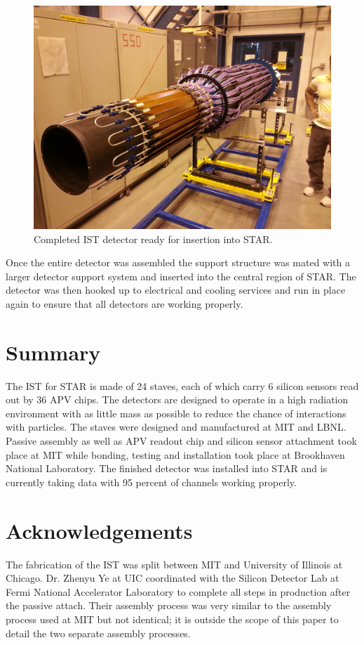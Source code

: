\documentclass[preprint,12pt]{elsarticle}
\begin{document}
\begin{figure}
\begin{center}
\includegraphics[width=5in, keepaspectratio=true, angle=0]{graphics/full.jpg}
\caption{Completed IST detector ready for insertion into STAR.
\label{fig:full}}
\end{center}
\end{figure}
%
Once the entire detector was assembled the support structure was mated with a
larger detector support system and inserted into the central region of STAR.
The detector was then hooked up to electrical and cooling services and run in
place again to ensure that all detectors are working properly.

\section{Summary}
The IST for STAR is made of 24 staves, each of which carry 6 silicon sensors read
out by 36 APV chips. The detectors are designed to operate in a high radiation
environment with as little mass as possible to reduce the chance of interactions
with particles. The staves were designed and manufactured at MIT and LBNL.
Passive assembly as well as APV readout chip and silicon sensor attachment took
place at MIT while bonding, testing and installation took place at Brookhaven
National Laboratory. The finished detector was installed into STAR and is
currently taking data with 95 percent of channels working properly.

\section{Acknowledgements}
The fabrication of the IST was split between MIT and University of Illinois at Chicago.
Dr. Zhenyu Ye at UIC coordinated with the Silicon Detector Lab at Fermi National
Accelerator Laboratory to complete all steps in production after the passive
attach.  Their assembly process was very similar to the assembly process used
at MIT but not identical; it is outside the scope of this paper to detail the
two separate assembly processes.
\end{document}
